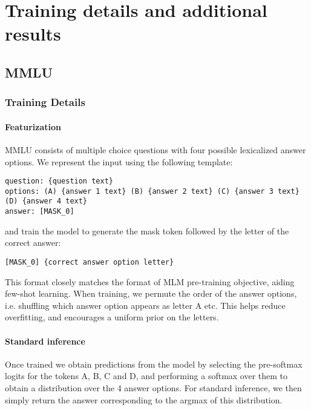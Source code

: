 \documentclass[10pt]{article} \usepackage[preprint]{tmlr}
\begin{document}



\clearpage
\appendix
\section{Training details and additional results}

\subsection{MMLU}
\label{app:mmlu}
\subsubsection{Training Details}

\paragraph{Featurization} MMLU consists of multiple choice questions with four possible lexicalized answer options.
We represent the input using the following template: 

\texttt{question: \{question text\} \\
options: (A) \{answer 1 text\} (B) \{answer 2 text\} (C) \{answer 3 text\} (D) \{answer 4 text\}\\ answer: [MASK\_0]
}

and train the model to generate the mask token followed by the letter of the correct answer:

\texttt{[MASK\_0] \{correct answer option letter\}}

This format closely matches the format of MLM pre-training objective, aiding few-shot learning. When training, we permute the order of the answer options, i.e. shuffling which answer option appears as letter A etc.
This helps reduce overfitting, and encourages a uniform prior on the letters.


\paragraph{Standard inference} Once trained we obtain predictions from the model by selecting the pre-softmax logits for the tokens A, B, C and D, and performing a softmax over them to obtain a distribution over the 4 answer options.
For standard inference, we then simply return the answer corresponding to the argmax of this distribution.
\end{document}
